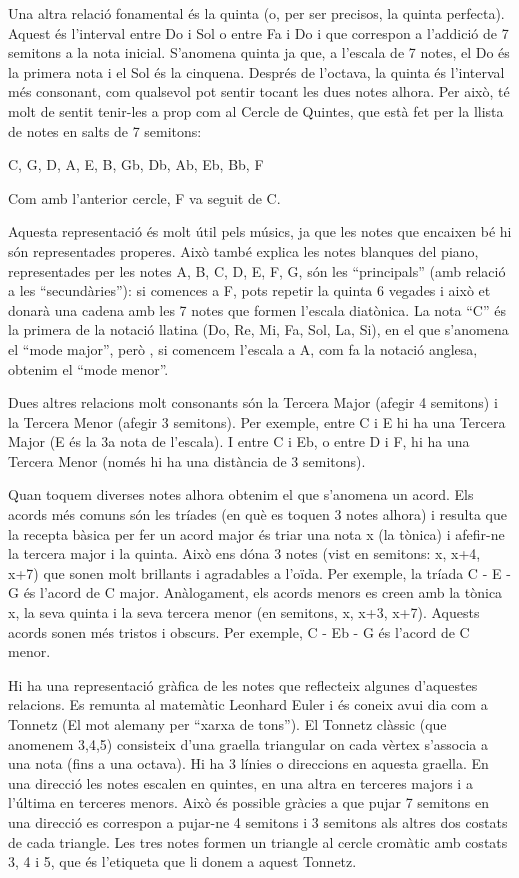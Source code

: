 Una altra relació fonamental és la quinta (o, per ser precisos, la quinta perfecta). Aquest és l'interval entre Do i Sol o entre Fa i Do i que correspon a l'addició de 7 semitons a la nota inicial. S'anomena quinta ja que, a l'escala de 7 notes, el Do és la primera nota i el Sol és la cinquena. Després de l'octava, la quinta és l'interval més consonant, com qualsevol pot sentir tocant les dues notes alhora. Per això, té molt de sentit tenir-les a prop com al Cercle de Quintes, que està fet per la llista de notes en salts de 7 semitons: 

C, G, D, A, E, B, Gb, Db, Ab, Eb, Bb, F

Com amb l'anterior cercle, F va seguit de C.

Aquesta representació és molt útil pels músics, ja que les notes que encaixen bé hi són representades properes. Això també explica les notes blanques del piano, representades per les notes A, B, C, D, E, F, G, són les   ``principals'' (amb relació a les ``secundàries''): si comences a F, pots repetir la quinta 6 vegades i això et donarà una cadena amb les 7 notes que formen l'escala diatònica. La nota ``C'' és la primera de la notació llatina (Do, Re, Mi, Fa, Sol, La, Si), en el que s'anomena el ``mode major'', però , si comencem l'escala a A, com fa la notació anglesa, obtenim el ``mode menor''. 

Dues altres relacions molt consonants són la Tercera Major (afegir 4 semitons) i la Tercera Menor (afegir 3 semitons). Per exemple, entre C i E hi ha una Tercera Major (E és la 3a nota de l'escala). I entre C i Eb, o entre D i F, hi ha una Tercera Menor (només hi ha una distància de 3 semitons).

Quan toquem diverses notes alhora obtenim el que s'anomena un acord. Els acords més comuns són les tríades (en què es toquen 3 notes alhora) i resulta que la recepta bàsica per fer un acord major és triar una nota x (la tònica) i afefir-ne la tercera major i la quinta. Això ens dóna 3 notes (vist en semitons: x, x+4, x+7) que sonen molt brillants i agradables a l'oïda. Per exemple, la tríada C - E - G és l'acord de C major. Anàlogament, els acords menors es creen amb la tònica x, la seva quinta i la seva tercera menor (en semitons, x, x+3, x+7). Aquests acords sonen més tristos i obscurs. Per exemple, C - Eb - G és l'acord de C menor.   

Hi ha una representació gràfica de les notes que reflecteix algunes d'aquestes relacions. Es remunta al matemàtic Leonhard Euler i és coneix avui dia com a Tonnetz (El mot alemany per ``xarxa de tons''). El Tonnetz clàssic (que anomenem 3,4,5) consisteix d'una graella triangular on cada vèrtex s'associa a una nota (fins a una octava). Hi ha 3 línies o direccions en aquesta graella. En una direcció les notes escalen en quintes, en una altra en terceres majors i a l'última en terceres menors. Això és possible gràcies a que pujar 7 semitons en una direcció es correspon a pujar-ne 4 semitons i 3 semitons als altres dos costats de cada triangle. Les tres notes formen un triangle al cercle cromàtic amb costats 3, 4 i 5, que és l'etiqueta que li donem a aquest Tonnetz. 

